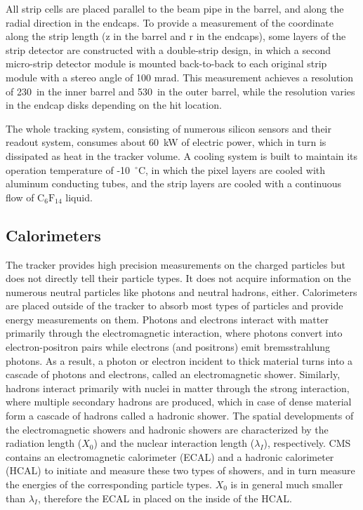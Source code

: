 All strip cells are placed parallel to the beam pipe in the barrel, and along the radial direction in the endcaps.
To provide a measurement of the coordinate along the strip length (z in the barrel and r in the endcaps),
some layers of the strip detector are constructed with a double-strip design, 
in which a second micro-strip detector module is mounted back-to-back to each original strip module with a stereo angle of 100 mrad. 
This measurement achieves a resolution of 230~\mum in the inner barrel and 530~\mum in the outer barrel, 
while the resolution varies in the endcap disks depending on the hit location.

The whole tracking system, consisting of numerous silicon sensors and their readout system,
consumes about 60~kW of electric power, which in turn is dissipated as heat in the tracker volume.
A cooling system is built to maintain its operation temperature of -10~${}^{\circ}$C, 
in which the pixel layers are cooled with aluminum conducting tubes, 
and the strip layers are cooled with a continuous flow of $\text{C}_{6}\text{F}_{14}$ liquid.


\subsection{Calorimeters}\label{sec:calos}

The tracker provides high precision measurements on the charged particles but does not directly tell their particle types.
It does not acquire information on the numerous neutral particles like photons and neutral hadrons, either.
Calorimeters are placed outside of the tracker to absorb most types of particles and provide energy measurements on them.
Photons and electrons interact with matter primarily through the electromagnetic interaction, 
where photons convert into electron-positron pairs while electrons (and positrons) emit bremsstrahlung photons.
As a result, a photon or electron incident to thick material turns into a cascade of photons and electrons, called an electromagnetic shower.
Similarly, hadrons interact primarily with nuclei in matter through the strong interaction,
where multiple secondary hadrons are produced, which in case of dense material form a cascade of hadrons called a hadronic shower.
The spatial developments of the electromagnetic showers and hadronic showers are characterized by the radiation length ($X_{0}$) and the nuclear interaction length ($\lambda_{I}$), respectively.
CMS contains an electromagnetic calorimeter (ECAL) and a hadronic calorimeter (HCAL) to initiate and measure these two types of showers,
and in turn measure the energies of the corresponding particle types.
$X_{0}$ is in general much smaller than $\lambda_{I}$, therefore the ECAL in placed on the inside of the HCAL.

